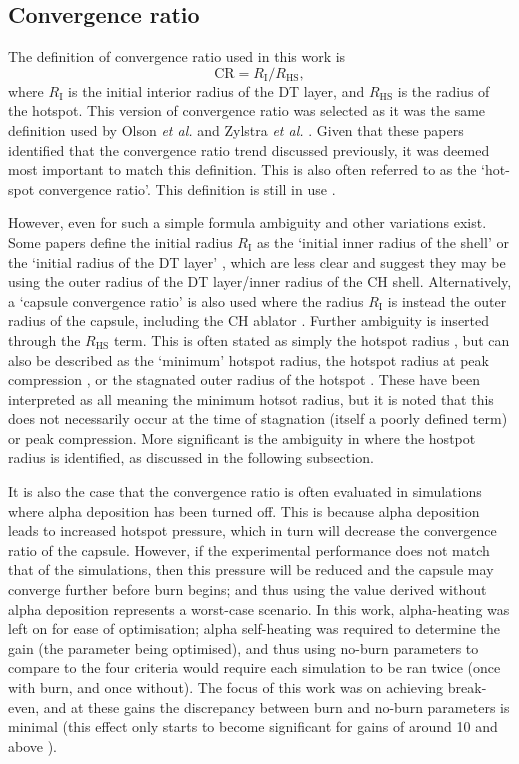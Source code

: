 \subsection{Convergence ratio}
The definition of convergence ratio used in this work is 
\begin{equation} \mathrm{CR} =  R_\mathrm{I}/R_\mathrm{HS}, \label{CR} \end{equation} 
where $R_\mathrm{I}$ is the initial interior radius of the DT layer, and $R_\mathrm{HS}$ is the radius of the hotspot. This version of convergence ratio was selected as it was the same definition used by Olson \textit{et al.} \cite{Olson2016} and Zylstra \textit{et al.} \cite{Zylstra2018}. Given that these papers identified that the convergence ratio trend discussed previously, it was deemed most important to match this definition. This is also often referred to as the `hot-spot convergence ratio'. This definition is still in use \cite{Olson2021}.

However, even for such a simple formula ambiguity and other variations exist. Some papers define the initial radius $R_\mathrm{I}$ as the `initial inner radius of the shell' \cite{Craxton2015} or the `initial radius of the DT layer' \cite{Haines2017a}, which are less clear and suggest they may be using the outer radius of the DT layer/inner radius of the CH shell. Alternatively, a `capsule convergence ratio' is also used where the radius $R_\mathrm{I}$ is instead the outer radius of the capsule, including the CH ablator \cite{Lindl2004}. Further ambiguity is inserted through the $R_\mathrm{HS}$ term. This is often stated as simply the hotspot radius \cite{Olson2016, Olson2021}, but can also be described as the `minimum' hotspot radius, the hotspot radius at peak compression \cite{Craxton2015}, or the stagnated outer radius of the hotspot \cite{Zylstra2018}. These have been interpreted as all meaning the minimum hotsot radius, but it is noted that this does not necessarily occur at the time of stagnation (itself a poorly defined term) or peak compression. More significant is the ambiguity in where the hostpot radius is identified, as discussed in the following subsection.

It is also the case that the convergence ratio is often evaluated in simulations where alpha deposition has been turned off. This is because alpha deposition leads to increased hotspot pressure, which in turn will decrease the convergence ratio of the capsule. However, if the experimental performance does not match that of the simulations, then this pressure will be reduced and the capsule may converge further before burn begins; and thus using the value derived without alpha deposition represents a worst-case scenario. In this work, alpha-heating was left on for ease of optimisation; alpha self-heating was required to determine the gain (the parameter being optimised), and thus using no-burn parameters to compare to the four criteria would require each simulation to be ran twice (once with burn, and once without). The focus of this work was on achieving break-even, and at these gains the discrepancy between burn and no-burn parameters is minimal (this effect only starts to become significant for gains of around 10 and above \cite{GoncharovPersonalComm}).

